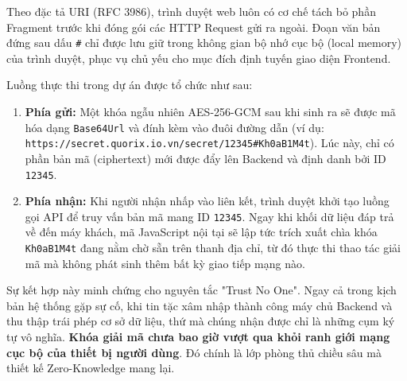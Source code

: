 Theo đặc tả URI (RFC 3986), trình duyệt web luôn có cơ chế tách bỏ phần Fragment trước khi đóng gói các HTTP Request gửi ra ngoài. Đoạn văn bản đứng sau dấu \texttt{\#} chỉ được lưu giữ trong không gian bộ nhớ cục bộ (local memory) của trình duyệt, phục vụ chủ yếu cho mục đích định tuyến giao diện Frontend.

Luồng thực thi trong dự án được tổ chức như sau:
\begin{enumerate}
    \item \textbf{Phía gửi:} Một khóa ngẫu nhiên AES-256-GCM sau khi sinh ra sẽ được mã hóa dạng \texttt{Base64Url} và đính kèm vào đuôi đường dẫn (ví dụ: \texttt{https://secret.quorix.io.vn/secret/12345\#Kh0aB1M4t}). Lúc \-này, chỉ có phần bản mã (ciphertext) mới được đẩy lên Backend và định danh bởi ID \texttt{12345}.
    \item \textbf{Phía nhận:} Khi người nhận nhấp vào liên kết, trình duyệt khởi tạo luồng gọi API để truy vấn bản mã mang ID \texttt{12345}. Ngay khi khối dữ liệu đáp trả về đến máy khách, mã JavaScript nội tại sẽ lập tức trích xuất chìa khóa \texttt{Kh0aB1M4t} đang nằm chờ sẵn trên thanh địa chỉ, từ đó thực thi thao tác giải mã mà không phát sinh thêm bất kỳ giao tiếp mạng nào.
\end{enumerate}

Sự kết hợp này minh chứng cho nguyên tắc "Trust No One". Ngay cả trong kịch bản hệ thống gặp sự cố, khi tin tặc xâm nhập thành công máy chủ Backend và thu thập trái phép cơ sở dữ liệu, thứ mà chúng nhận được chỉ là những cụm ký tự vô nghĩa. \textbf{Khóa giải mã chưa bao giờ vượt qua khỏi ranh giới mạng cục bộ của thiết bị người dùng}. Đó chính là lớp phòng thủ chiều sâu mà thiết kế Zero-Knowledge mang lại.